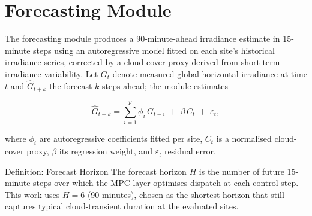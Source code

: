 \section{Forecasting Module}
The forecasting module produces a 90-minute-ahead irradiance estimate in 15-minute steps using
an autoregressive model fitted on each site's historical irradiance series, corrected by a
cloud-cover proxy derived from short-term irradiance variability. Let $G_t$ denote measured
global horizontal irradiance at time $t$ and $\hat{G}_{t+k}$ the forecast $k$ steps ahead; the
module estimates

\begin{equation}
\hat{G}_{t+k} = \sum_{i=1}^{p} \phi_i\, G_{t-i} \;+\; \beta \, C_t \;+\; \varepsilon_t,
\label{eq:forecast}
\end{equation}

\noindent
where $\phi_i$ are autoregressive coefficients fitted per site, $C_t$ is a normalised
cloud-cover proxy, $\beta$ its regression weight, and $\varepsilon_t$ residual error.

\begin{keybox}{Definition: Forecast Horizon}
The forecast horizon $H$ is the number of future 15-minute steps over which the MPC layer
optimises dispatch at each control step. This work uses $H = 6$ (90 minutes), chosen as the
shortest horizon that still captures typical cloud-transient duration at the evaluated sites.
\end{keybox}
